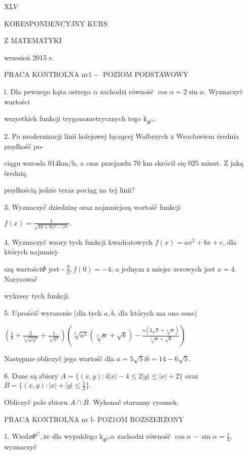 \documentclass[a4paper,12pt]{article}
\begin{document}
XLV

KORESPONDENCYJNY KURS

Z MATEMATYKI

wrzesień 2015 r.

PRACA KONTROLNA $\mathrm{n}\mathrm{r} 1 -$ POZIOM PODSTAWOWY

l. Dla pewnego kąta ostrego $\alpha$ zachodzi równośč $\cos\alpha =  2\sin\alpha$. Wyznaczyč wartości

wszystkich funkcji trygonometrycznych tego $\mathrm{k}_{\Phi^{\mathrm{t}\mathrm{a}}}.$

2. Po modernizacji linii kolejowej łączącej Walbrzych $\mathrm{z}$ Wrocławiem średnia prędkośč po-

ciągu wzrosla $014\mathrm{k}\mathrm{m}/\mathrm{h}$, a czas przejazdu 70 km skrócił się $025$ minut. $\mathrm{Z}$ jaką średnią

prędkością jedzie teraz pociąg na tej linii?

3. Wyznaczyč dziedzinę oraz najmniejszą wartośč funkcji

$f(x)=\displaystyle \frac{1}{\sqrt{10+8x^{2}-x^{4}}}.$

4. Wyznaczyč wzory tych funkcji kwadratowych $f(x)=ax^{2}+bx+c$, dla których najmniej-

szą wartości$\Phi$ jest - $\displaystyle \frac{9}{2}, f(0) =-4$, a jednym $\mathrm{z}$ miejsc zerowych jest $x=4$. Narysowač

wykresy tych funkcji.

5. Uprościč wyrazenie (dla tych $a, b$, dla których ma ono sens)

$(\displaystyle \frac{1}{b}+\frac{2}{\sqrt[6]{a^{2}b^{3}}}+\frac{1}{\sqrt[3]{a^{2}}})(\sqrt[3]{a^{2}}(\sqrt[3]{a}+\sqrt{b})-\frac{a(2\sqrt{b}+\sqrt[3]{a})}{\sqrt[3]{a}+\sqrt{b}})$

Następnie obliczyč jego wartośč dla $a=5\sqrt{5}\mathrm{i}b=14-6\sqrt{5}.$

6. Dane są zbiory $A=\{(x,y):4|x|-4\leq 2|y|\leq|x|+2\}$ oraz $B=\displaystyle \{(x,y):|x|+|y|\leq\frac{5}{2}\}.$

Obliczyč pole zbioru $A\cap B$. Wykonač staranny rysunek.




PRACA KONTROLNA nr l- POZ1OM ROZSZERZONY

1. $\mathrm{W}\mathrm{i}\mathrm{e}\mathrm{d}\mathrm{z}\Phi^{\mathrm{C}}, \dot{\mathrm{z}}\mathrm{e}$ dla wypukłego $\mathrm{k}_{\Phi^{\mathrm{t}\mathrm{a}}} \alpha$ zachodzi równośč $\cos\alpha-\sin\alpha = \displaystyle \frac{1}{3}$, wyznaczyč
\end{document}
